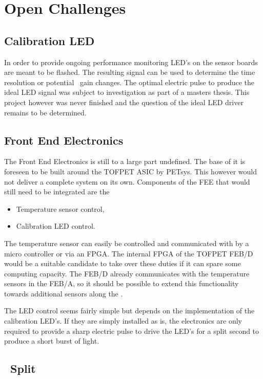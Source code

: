 \documentclass[../BTOF_summary.tex]{subfiles}
\begin{document}
\section{Open Challenges}


\subsection{Calibration LED}

In order to provide ongoing performance monitoring LED's on the sensor boards are meant to be flashed.
The resulting signal can be used to determine the time resolution or potential \sipm\ gain changes.
The optimal electric pulse to produce the ideal LED signal was subject to investigation as part of a masters thesis.
This project however was never finished and the question of the ideal LED driver remains to be determined.

\subsection{Front End Electronics}

The Front End Electronics is still to a large part undefined.
The base of it is foreseen to be built around the TOFPET ASIC by PETsys.
This however would not deliver a complete system on its own.
Components of the FEE that would still need to be integrated are the 
\begin{itemize}
    \item Temperature sensor control,
    \item Calibration LED control.
\end{itemize}

The temperature sensor can easily be controlled and communicated with by a micro controller or via an FPGA.
The internal FPGA of the TOFPET FEB/D would be a suitable candidate to take over these duties if it can spare some computing capacity.
The FEB/D already communicates with the temperature sensors in the FEB/A, so it should be possible to extend this functionality towards additional sensors along the \railboard .

The LED control seems fairly simple but depends on the implementation of the calibration LED's.
If they are simply installed as is, the electronics are only required to provide a sharp electric pulse to drive the LED's for a split second to produce a short burst of light.

\subsection[]{\railboard\ Split}
\end{document}
